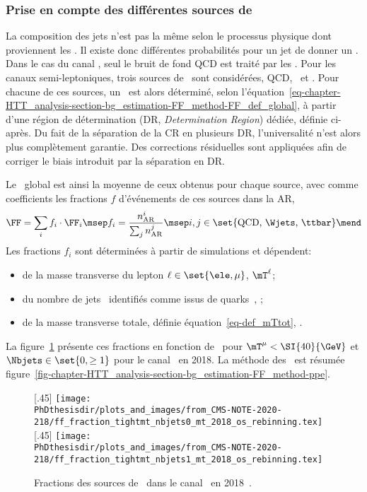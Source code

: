 \subsubsection{Prise en compte des différentes sources de \ftauhs}
La composition des jets n'est pas la même selon le processus physique dont proviennent les \ftauhs.
Il existe donc différentes probabilités pour un jet de donner un \ftauh.
Dans le cas du canal \tauh\tauh, seul le bruit de fond QCD est traité par les \fakefactors.
Pour les canaux semi-leptoniques, trois sources de \ftauhs\ sont considérées, QCD, \Wjets\ et \ttbar.
Pour chacune de ces sources, un \fakefactor\ est alors déterminé, selon l'équation~\eqref{eq-chapter-HTT_analysis-section-bg_estimation-FF_method-FF_def_global}, à partir d'une région de détermination (DR, \emph{Determination Region}) dédiée, définie ci-après.
Du fait de la séparation de la CR en plusieurs DR, l'universalité n'est alors plus complètement garantie.
Des corrections résiduelles sont appliquées afin de corriger le biais introduit par la séparation en DR.
\par
Le \fakefactor\ global est ainsi la moyenne de ceux obtenus pour chaque source, avec comme coefficients les fractions $f$ d'événements de ces sources dans la AR, \ie
\begin{equation}
\FF = \sum_i f_i \cdot \FF_i
\msep
f_i = \frac{n_\text{AR}^i}{\sum_j n_\text{AR}^{j}}
\msep
i,j \in \set{\text{QCD, \Wjets, \ttbar}}
\mend
\end{equation}
Les fractions $f_i$ sont déterminées à partir de simulations et dépendent:
\begin{itemize}
\item de la masse transverse du lepton $\ell\in\set{\ele,\mu}$, $\mT^{\ell}$;
\item du nombre de jets \Nprebjets\ identifiés comme issus de quarks~\quarkb, \Nbjets;
\item de la masse transverse totale, définie équation~\eqref{eq-def_mTtot}, \mTtot.
\end{itemize}
La figure~\ref{fig-chapter-HTT_analysis-section-bg_estimation-FF_method-fractions} présente ces fractions en fonction de \mTtot\ pour $\mT^{\mu} < \SI{40}{\GeV}$ et $\Nbjets\in\set{0,\geq1}$ pour le canal \mu\tauh\ en 2018.
La méthode des \fakefactors\ est résumée figure~\ref{fig-chapter-HTT_analysis-section-bg_estimation-FF_method-ppe}.
\begin{figure}[h]
\centering

[.45\textwidth]
{\texttt{[image: \\PhDthesisdir/plots\_and\_images/from\_CMS-NOTE-2020-218/ff\_fraction\_tightmt\_nbjets0\_mt\_2018\_os\_rebinning.tex]}}
\hfill
{}[.45\textwidth]
{\texttt{[image: \\PhDthesisdir/plots\_and\_images/from\_CMS-NOTE-2020-218/ff\_fraction\_tightmt\_nbjets1\_mt\_2018\_os\_rebinning.tex]}}

\caption[Fractions des sources de \ftauhs\ dans le canal \mu\tauh\ en 2018.]{Fractions des sources de \ftauhs\ dans le canal \mu\tauh\ en 2018~\cite{CMS-NOTE-2020-218}.}
\label{fig-chapter-HTT_analysis-section-bg_estimation-FF_method-fractions}
\end{figure}
